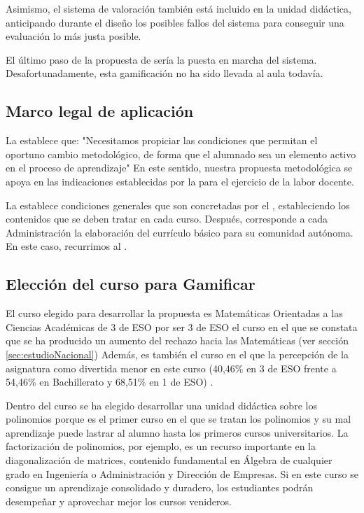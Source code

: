 Asimismo, el sistema de valoración también está incluido en la unidad didáctica, anticipando durante el diseño los posibles fallos del sistema para conseguir una evaluación lo más justa posible.

El último paso de la propuesta de \cite{kapp2013gamification} sería la puesta en marcha del sistema. 
%
Desafortunadamente, esta gamificación no ha sido llevada al aula todavía.

\subsection{Marco legal de aplicación}

La \lomce establece que: "Necesitamos propiciar las condiciones que permitan el oportuno cambio metodológico, de forma que el alumnado sea un elemento activo en el proceso de aprendizaje" 
%
En este sentido, nuestra propuesta metodológica se apoya en las indicaciones establecidas por la \lomce para el ejercicio de la labor docente.

La \lomce establece condiciones generales que son concretadas por el \boe, estableciendo los contenidos que se deben tratar en cada curso.
%
Después, corresponde a cada Administración la elaboración del currículo básico para su comunidad autónoma.
%
En este caso, recurrimos al \bocm.


\subsection{Elección del curso para Gamificar}

El curso elegido para desarrollar la propuesta es Matemáticas Orientadas a las Ciencias Académicas de 3 de ESO por ser 3 de ESO el curso en el que se constata que se ha producido un aumento del rechazo hacia las Matemáticas (ver sección \ref{sec:estudioNacional}) 
%
Además, es también el curso en el que la percepción de la asignatura como divertida menor en este curso (40,46\% en 3 de ESO frente a 54,46\% en Bachillerato y 68,51\% en 1 de ESO) \cite{ActitudesHaciaMates}.

Dentro del curso se ha elegido desarrollar una unidad didáctica sobre los polinomios porque es el primer curso en el que se tratan los polinomios y su mal aprendizaje puede lastrar al alumno hasta los primeros cursos universitarios.
%
La factorización de polinomios, por ejemplo, es un recurso importante en la diagonalización de matrices, contenido fundamental en Álgebra de cualquier grado en Ingeniería o Administración y Dirección de Empresas.
%
Si en este curso se consigue un aprendizaje consolidado y duradero, los estudiantes podrán desempeñar y aprovechar mejor los cursos venideros.


